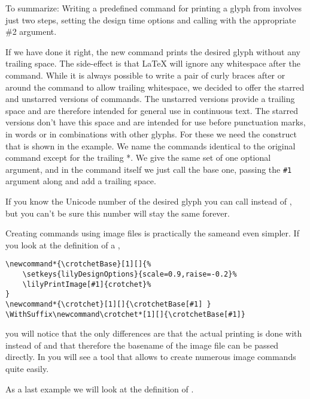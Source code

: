 \documentclass{article}
\begin{document}
To summarize: Writing a predefined command for printing a glyph from \emmentaler involves just two steps, setting the design time options and calling  with the appropriate \#2 argument.

\medskip
If we have done it right, the new command prints the desired glyph without any trailing space. 
The side-effect is that \LaTeX{} will ignore any whitespace after the command.
While it is always possible to write a pair of curly braces after or around the command to allow trailing whitespace, we decided to offer the starred and unstarred versions of commands.
The unstarred versions provide a trailing space and are therefore intended for general use in continuous text. 
The starred versions don't have this space and are intended for use before punctuation marks, in words or in combinations with other glyphs.
For these we need the  construct that is shown in the example.
We name the commands identical to the original command except for the trailing *.
We give the same set of one optional argument, and in the command itself we just call the base one, passing the \texttt{\#1} argument along and add a trailing space.

\medskip
If you know the Unicode number of the desired glyph you can call  instead of , but you can't be sure this number will stay the same forever.

\medskip
Creating commands using image files is practically the sameand even simpler.
If you look at the definition of a , 
\begin{verbatim}
\newcommand*{\crotchetBase}[1][]{%
    \setkeys{lilyDesignOptions}{scale=0.9,raise=-0.2}%
    \lilyPrintImage[#1]{crotchet}%
}
\newcommand*{\crotchet}[1][]{\crotchetBase[#1] }
\WithSuffix\newcommand\crotchet*[1][]{\crotchetBase[#1]}
\end{verbatim}
you will notice that the only differences are that the actual printing is done with  instead of  and that therefore the basename of the image file can be passed directly.
In  you will see a tool that allows to create numerous image commands quite easily.

\bigskip
As a last example we will look at the definition of \lilyRFZ {}.
\end{document}
